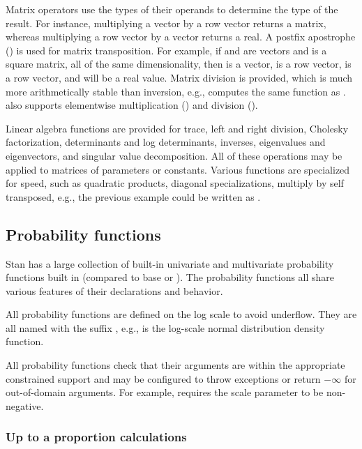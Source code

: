 \documentclass[article]{jss}
\begin{document}
Matrix operators use the types of their operands to determine the type
of the result.  For instance, multiplying a vector by a row vector
returns a matrix, whereas multiplying a row vector by a vector returns
a real.  A postfix apostrophe () is used for matrix
transposition.  For example, if  and  are vectors and
 is a square matrix, all of the same dimensionality, then
 is a vector,  is a row vector,  is a row vector, and  will be a real value.  Matrix division is provided, which is
much more arithmetically stable than inversion, e.g.,  computes the same function as .
 also supports elementwise multiplication ()
and division ().

Linear algebra functions are provided for trace, left and right
division, Cholesky factorization, determinants and log determinants,
inverses, eigenvalues and eigenvectors, and singular value
decomposition.  All of these operations may be applied to matrices of
parameters or constants.  Various functions are specialized for speed,
such as quadratic products, diagonal specializations, multiply by self
transposed, e.g., the previous example could be written as
.

\subsection{Probability functions}

Stan has a large collection of built-in univariate and multivariate
probability functions built in (compared to base  or
).  The probability functions all share various
features of their declarations and behavior.  

All probability functions are defined on the log scale to avoid
underflow.  They are all named with the suffix , e.g.,
 is the log-scale normal distribution density
function.

All probability functions check that their arguments are within the
appropriate constrained support and may be configured to throw
exceptions or return $-\infty$ for out-of-domain arguments.  For
example,  requires the scale parameter
 to be non-negative.

\subsubsection{Up to a proportion calculations}
\end{document}
